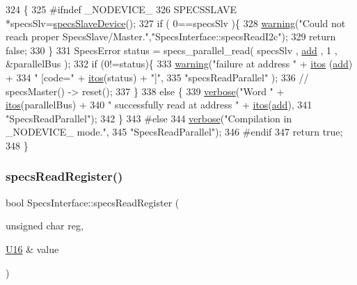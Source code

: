 \begin{DoxyCode}
324                                                       \{
325 \textcolor{preprocessor}{#ifndef \_NODEVICE\_
}
326   SPECSSLAVE *specsSlv=\hyperlink{classSpecsInterface_ac8d4711197f484f055533ec1e5ae01a1}{specsSlaveDevice}();
327   \textcolor{keywordflow}{if} ( 0==specsSlv )\{
328     \hyperlink{classObject_a65cd4fda577711660821fd2cd5a3b4c9}{warning}(\textcolor{stringliteral}{"Could not reach proper SpecsSlave/Master."},\textcolor{stringliteral}{"SpecsInterface::specsReadI2c"});
329     \textcolor{keywordflow}{return} \textcolor{keyword}{false};
330   \}
331   SpecsError status = specs\_parallel\_read( specsSlv , \hyperlink{classAttrib_a235f773af19c900264a190b00a3b4ad7}{add} , 1 , &parallelBus );
332   \textcolor{keywordflow}{if} (0!=status)\{
333     \hyperlink{classObject_a65cd4fda577711660821fd2cd5a3b4c9}{warning}(\textcolor{stringliteral}{"failure at address "} + \hyperlink{Tools_8h_af330027dbdafb9a30768b3613c553e60}{itos} (\hyperlink{classAttrib_a235f773af19c900264a190b00a3b4ad7}{add}) +
334             \textcolor{stringliteral}{" [code="} + \hyperlink{Tools_8h_af330027dbdafb9a30768b3613c553e60}{itos}(status) + \textcolor{stringliteral}{"]"},
335             \textcolor{stringliteral}{"specsReadParallel"} );
336     \textcolor{comment}{//    specsMaster() -> reset();}
337   \}
338   \textcolor{keywordflow}{else} \{
339     \hyperlink{classObject_a83d2db2df682907ea1115ad721c1c4a1}{verbose}(\textcolor{stringliteral}{"Word "} + \hyperlink{Tools_8h_af330027dbdafb9a30768b3613c553e60}{itos}(parallelBus) +
340             \textcolor{stringliteral}{" successfully read at address "} + \hyperlink{Tools_8h_af330027dbdafb9a30768b3613c553e60}{itos}(\hyperlink{classAttrib_a235f773af19c900264a190b00a3b4ad7}{add}),
341             \textcolor{stringliteral}{"SpecsReadParallel"});
342   \}
343 \textcolor{preprocessor}{#else
}
344   \hyperlink{classObject_a83d2db2df682907ea1115ad721c1c4a1}{verbose}(\textcolor{stringliteral}{"Compilation in \_NODEVICE\_ mode."},
345           \textcolor{stringliteral}{"SpecsReadParallel"});
346 \textcolor{preprocessor}{#endif
}
347   \textcolor{keywordflow}{return} \textcolor{keyword}{true};
348 \}
\end{DoxyCode}
\mbox{\label{classSpecsInterface_a87080bb575d1b9d0bb313c48e7d3f59a}} 
\subsubsection{\texorpdfstring{specs\+Read\+Register()}{specsReadRegister()}}
{\footnotesize\ttfamily bool Specs\+Interface\+::specs\+Read\+Register (\begin{DoxyParamCaption}\item[{unsigned char}]{reg,  }\item[{\hyperlink{ICECALv3_8h_adf928e51a60dba0df29d615401cc55a8}{U16} \&}]{value }\end{DoxyParamCaption})\hspace{0.3cm}{\ttfamily [inherited]}}

